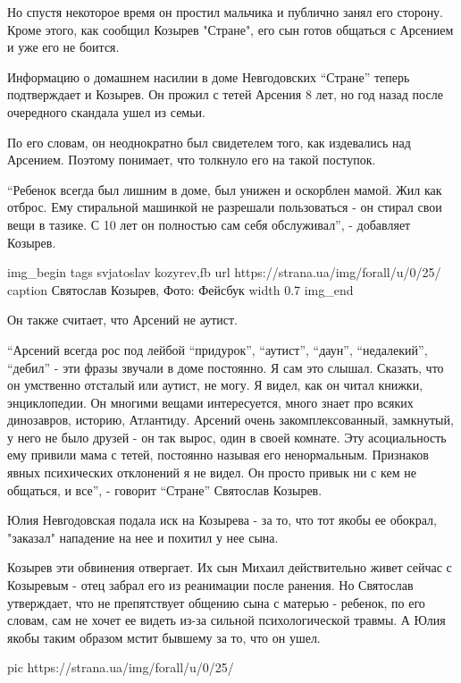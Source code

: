 Но спустя некоторое время он простил мальчика и публично занял его сторону.
Кроме этого, как сообщил Козырев "Стране", его сын готов общаться с Арсением и
уже его не боится.

Информацию о домашнем насилии в доме Невгодовских “Стране” теперь подтверждает
и Козырев. Он прожил с тетей Арсения 8 лет, но год назад после очередного
скандала ушел из семьи. 

По его словам, он неоднократно был свидетелем того, как издевались над
Арсением. Поэтому понимает, что толкнуло его на такой поступок.

“Ребенок всегда был лишним в доме, был унижен и оскорблен мамой. Жил как
отброс. Ему стиральной машинкой не разрешали пользоваться - он стирал свои вещи
в тазике. С 10 лет он полностью сам себя обслуживал”, - добавляет Козырев. 

\ifcmt
img_begin 
	tags svjatoslav kozyrev,fb
	url https://strana.ua/img/forall/u/0/25/%
	caption Святослав Козырев, Фото: Фейсбук
	width 0.7
img_end
\fi

Он также считает, что Арсений не аутист.

“Арсений всегда рос под лейбой “придурок”, “аутист”, “даун”, “недалекий”,
“дебил” - эти фразы звучали в доме постоянно. Я сам это слышал. Сказать, что он
умственно отсталый или аутист, не могу. Я видел, как он читал книжки,
энциклопедии. Он многими вещами интересуется, много знает про всяких
динозавров, историю, Атлантиду. Арсений очень закомплексованный, замкнутый, у
него не было друзей - он так вырос, один в своей комнате. Эту асоциальность ему
привили мама с тетей, постоянно называя его ненормальным. Признаков явных
психических отклонений я не видел. Он просто привык ни с кем не общаться, и
все”, - говорит “Стране” Святослав Козырев. 

Юлия Невгодовская подала иск на Козырева - за то, что тот якобы ее обокрал,
"заказал" нападение на нее и похитил у нее сына.  

Козырев эти обвинения отвергает. Их сын Михаил действительно живет сейчас с
Козыревым - отец забрал его из реанимации после ранения. Но Святослав
утверждает, что не препятствует общению сына с матерью - ребенок, по его
словам, сам не хочет ее видеть из-за сильной психологической травмы. А Юлия
якобы таким образом мстит бывшему за то, что он ушел.

\ifcmt
pic https://strana.ua/img/forall/u/0/25/%
\fi

